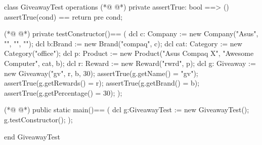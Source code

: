 \begin{vdmpp}[breaklines=true]
class GiveawayTest
 operations
(*@
\label{assertTrue:3}
@*)
  private assertTrue: bool ==> ()
    assertTrue(cond) == return
    pre cond;
    
(*@
\label{testConstructor:7}
@*)
  private testConstructor()==
  (
      dcl c: Company := new Company("Asus", "", "", "");
      dcl b:Brand := new Brand("compaq", c);
      dcl cat: Category := new Category("office");
      dcl p: Product := new Product("Asus Compaq X", "Awesome Computer", cat, b);
      dcl r: Reward := new Reward("rwrd", p);
   dcl g: Giveaway := new Giveaway("gv", {r}, b, 30);
   assertTrue(g.getName() = "gv");
   assertTrue(g.getRewards() = {r});
   assertTrue(g.getBrand() = b);
   assertTrue(g.getPercentage() = 30);
  );
  
(*@
\label{main:21}
@*)
  public static main()==
    (
   dcl g:GiveawayTest := new GiveawayTest();
   g.testConstructor();
    );

end GiveawayTest
\end{vdmpp}
